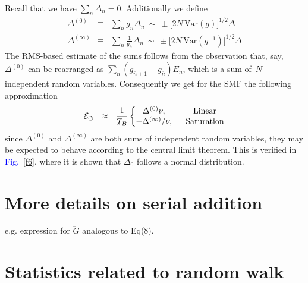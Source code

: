 \documentclass[aps,prl,floats,floatfix,twocolumn]{revtex4}
\newcommand{\amatrix}[1]{\begin{matrix} #1 \end{matrix}}
\newcommand{\mylabel}[1]{\label{#1}}
\newcommand{\beq}{\begin{eqnarray}}
\newcommand{\eeq}{\end{eqnarray}}
\newcommand{\be}[1]{\begin{eqnarray}\ifthenelse{#1=-1}
{\nonumber}{\ifthenelse{#1=0}{}{\mylabel{e#1}}}}
\newcommand{\ee}{\end{eqnarray}}
\newcommand{\Fig}[1]{\textcolor{blue}{Fig.}\!\!~\ref{#1}}
\begin{document}
Recall that we have ${\sum_n\Delta_n=0}$. Additionally we define 
%
\beq
\Delta^{(0)} &\equiv&  \sum_{n} g_{\bar{n}}  \Delta_n 
\ \sim \ \pm \Big[2N \, \mbox{Var}(g)\Big]^{1/2} \Delta
\\
\Delta^{(\infty)} &\equiv& \sum_{n} \frac{1}{g_{\bar{n}}}  \Delta_n
\ \sim \ \pm \Big[2N \, \mbox{Var}(g^{-1})\Big]^{1/2} \Delta
\eeq
%
The RMS-based estimate of the sums follows from the observation 
that, say, $\Delta^{(0)}$ can be rearranged as 
${\sum_n (g_{\bar{n}+1}-g_{\bar{n}}) E_n}$, 
which is a sum of~$N$ independent random variables.  
Consequently we get for the SMF the following approximation 
%
\be{131}
\mathcal{E}_{\circlearrowleft} \ \ \approx \ \ 
\frac{1}{T_B}
\left\{
\amatrix{
\Delta^{(0)}\nu, & \ \ \text{Linear} \cr 
-\Delta^{(\infty)}/\nu , & \ \ \text{Saturation}
}\right.
\eeq
%
since  $\Delta^{(0)} $ and $\Delta^{(\infty)} $ 
are both sums of independent random variables,
they may be expected to behave according to the central limit theorem.
This is verified in \Fig{f6}, 
where it is shown that  $\Delta_0$ follows a normal distribution.



\section{More details on serial addition}

e.g. expression for $\overleftarrow{G}$ analogous to Eq(8).

\section{Statistics related to random walk}
\end{document}
